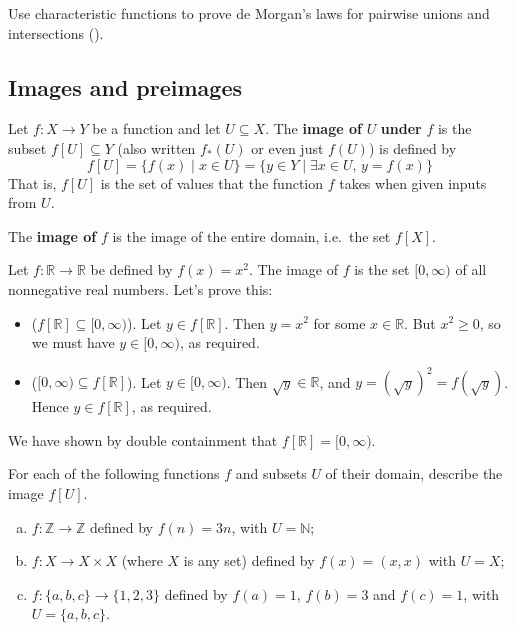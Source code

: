 \begin{exercise}
Use characteristic functions to prove de Morgan's laws for pairwise unions and intersections ().
\end{exercise}

\subsection*{Images and preimages}

\begin{definition}
\label{defImage}
Let $f : X \to Y$ be a function and let $U \subseteq X$. The \textbf{image of} $U$ \textbf{under} $f$ is the subset $f[U] \subseteq Y$ (also written $f_*(U)$  or even just $f(U)$) is defined by
\[ f[U] = \{ f(x) \mid x \in U \} = \{ y \in Y \mid \exists x \in U,\, y = f(x) \} \]
That is, $f[U]$ is the set of values that the function $f$ takes when given inputs from $U$.

The \textbf{image of} $f$ is the image of the entire domain, i.e.\ the set $f[X]$.
\end{definition}

\begin{example}
Let $f : \mathbb{R} \to \mathbb{R}$ be defined by $f(x)=x^2$. The image of $f$ is the set $[0,\infty)$ of all nonnegative real numbers. Let's prove this:
\begin{itemize}
\item ($f[\mathbb{R}] \subseteq [0,\infty)$). Let $y \in f[\mathbb{R}]$. Then $y=x^2$ for some $x \in \mathbb{R}$. But $x^2 \ge 0$, so we must have $y \in [0,\infty)$, as required.
\item ($[0,\infty) \subseteq f[\mathbb{R}]$). Let $y \in [0,\infty)$. Then $\sqrt{y} \in \mathbb{R}$, and $y = (\sqrt{y})^2 = f(\sqrt{y})$. Hence $y \in f[\mathbb{R}]$, as required.
\end{itemize}
We have shown by double containment that $f[\mathbb{R}] = [0,\infty)$.
\end{example}

\begin{exercise}
For each of the following functions $f$ and subsets $U$ of their domain, describe the image $f[U]$.
\begin{enumerate}[(a)]
\item $f : \mathbb{Z} \to \mathbb{Z}$ defined by $f(n)=3n$, with $U = \mathbb{N}$;
\item $f : X \to X \times X$ (where $X$ is any set) defined by $f(x)=(x,x)$ with $U=X$;
\item $f : \{ a, b, c \} \to \{ 1, 2, 3 \}$ defined by $f(a)=1$, $f(b)=3$ and $f(c)=1$, with $U=\{a,b,c\}$.
\end{enumerate}
\end{exercise}

